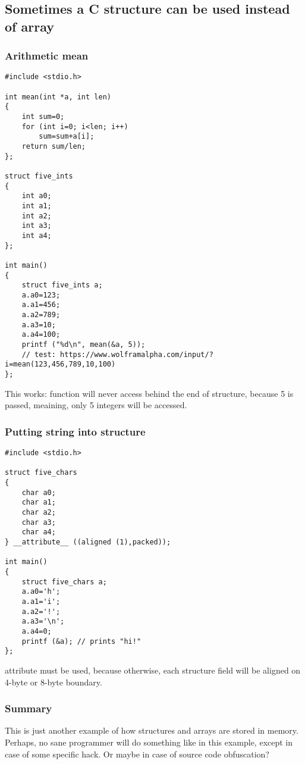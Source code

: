 \subsection{Sometimes a C structure can be used instead of array}

\subsubsection{Arithmetic mean}

\begin{lstlisting}[style=customc]
#include <stdio.h>

int mean(int *a, int len)
{
	int sum=0;
	for (int i=0; i<len; i++)
		sum=sum+a[i];
	return sum/len;
};

struct five_ints
{
	int a0;
	int a1;
	int a2;
	int a3;
	int a4;
};

int main()
{
	struct five_ints a;
	a.a0=123;
	a.a1=456;
	a.a2=789;
	a.a3=10;
	a.a4=100;
	printf ("%d\n", mean(&a, 5));
	// test: https://www.wolframalpha.com/input/?i=mean(123,456,789,10,100)
};
\end{lstlisting}

This works:  function will never access behind the end of  structure,
because 5 is passed, meaining, only 5 integers will be accessed.

\subsubsection{Putting string into structure}

\begin{lstlisting}[style=customc]
#include <stdio.h>

struct five_chars
{
	char a0;
	char a1;
	char a2;
	char a3;
	char a4;
} __attribute__ ((aligned (1),packed));

int main()
{
	struct five_chars a;
	a.a0='h';
	a.a1='i';
	a.a2='!';
	a.a3='\n';
	a.a4=0;
	printf (&a); // prints "hi!"
};
\end{lstlisting}

 attribute must be used, because otherwise,
each structure field will be aligned on 4-byte or 8-byte boundary.

\subsubsection{Summary}

This is just another example of how structures and arrays are stored in memory.
Perhaps, no sane programmer will do something like in this example, except in case of some specific hack.
Or maybe in case of source code obfuscation?


